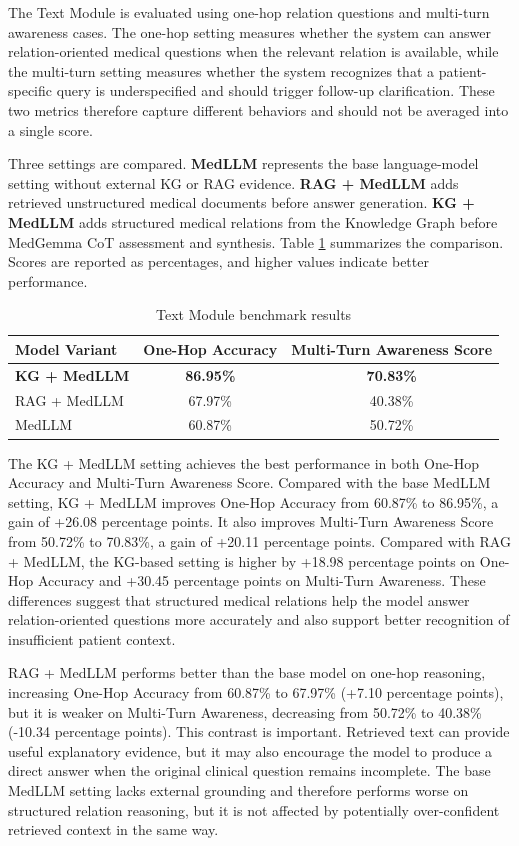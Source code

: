 The Text Module is evaluated using one-hop relation questions and multi-turn awareness cases. The one-hop setting measures whether the system can answer relation-oriented medical questions when the relevant relation is available, while the multi-turn setting measures whether the system recognizes that a patient-specific query is underspecified and should trigger follow-up clarification. These two metrics therefore capture different behaviors and should not be averaged into a single score.

Three settings are compared. \textbf{MedLLM} represents the base language-model setting without external KG or RAG evidence. \textbf{RAG + MedLLM} adds retrieved unstructured medical documents before answer generation. \textbf{KG + MedLLM} adds structured medical relations from the Knowledge Graph before MedGemma CoT assessment and synthesis. Table \ref{table:text-module-benchmark} summarizes the comparison. Scores are reported as percentages, and higher values indicate better performance.

\begin{table}[H]
\centering
\begin{tabular}{l c c}
\hline\hline
Model Variant & One-Hop Accuracy & Multi-Turn Awareness Score \\
\hline
\textbf{KG + MedLLM} & \textbf{86.95\%} & \textbf{70.83\%} \\
RAG + MedLLM & 67.97\% & 40.38\% \\
MedLLM & 60.87\% & 50.72\% \\
\hline\hline
\end{tabular}
\caption{Text Module benchmark results}
\label{table:text-module-benchmark}
\end{table}

The KG + MedLLM setting achieves the best performance in both One-Hop Accuracy and Multi-Turn Awareness Score. Compared with the base MedLLM setting, KG + MedLLM improves One-Hop Accuracy from 60.87\% to 86.95\%, a gain of +26.08 percentage points. It also improves Multi-Turn Awareness Score from 50.72\% to 70.83\%, a gain of +20.11 percentage points. Compared with RAG + MedLLM, the KG-based setting is higher by +18.98 percentage points on One-Hop Accuracy and +30.45 percentage points on Multi-Turn Awareness. These differences suggest that structured medical relations help the model answer relation-oriented questions more accurately and also support better recognition of insufficient patient context.

RAG + MedLLM performs better than the base model on one-hop reasoning, increasing One-Hop Accuracy from 60.87\% to 67.97\% (+7.10 percentage points), but it is weaker on Multi-Turn Awareness, decreasing from 50.72\% to 40.38\% (-10.34 percentage points). This contrast is important. Retrieved text can provide useful explanatory evidence, but it may also encourage the model to produce a direct answer when the original clinical question remains incomplete. The base MedLLM setting lacks external grounding and therefore performs worse on structured relation reasoning, but it is not affected by potentially over-confident retrieved context in the same way.

